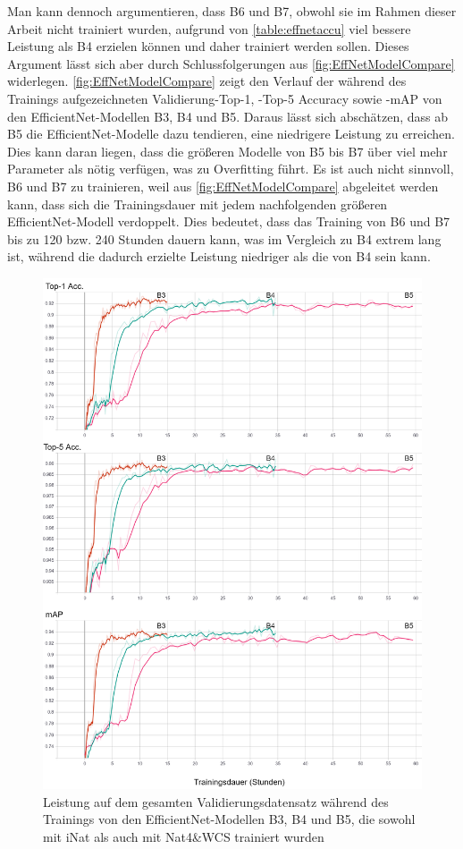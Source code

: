 Man kann dennoch argumentieren, dass B6 und B7, obwohl sie im Rahmen dieser Arbeit nicht trainiert wurden, aufgrund von \autoref{table:effnetaccu} viel bessere Leistung als B4 erzielen können und daher trainiert werden sollen. Dieses Argument lässt sich aber durch Schlussfolgerungen aus \autoref{fig:EffNetModelCompare} widerlegen. \autoref{fig:EffNetModelCompare} zeigt den Verlauf der während des Trainings aufgezeichneten Validierung-Top-1, -Top-5 Accuracy sowie -mAP von den EfficientNet-Modellen B3, B4 und B5. Daraus lässt sich abschätzen, dass ab B5 die EfficientNet-Modelle dazu tendieren, eine niedrigere Leistung zu erreichen. Dies kann daran liegen, dass die größeren Modelle von B5 bis B7 über viel mehr Parameter als nötig verfügen, was zu Overfitting führt. Es ist auch nicht sinnvoll, B6 und B7 zu trainieren, weil aus \autoref{fig:EffNetModelCompare} abgeleitet werden kann, dass sich die Trainingsdauer mit jedem nachfolgenden größeren EfficientNet-Modell verdoppelt. Dies bedeutet, dass das Training von B6 und B7 bis zu 120 bzw. 240 Stunden dauern kann, was im Vergleich zu B4 extrem lang ist, während die dadurch erzielte Leistung niedriger als die von B4 sein kann.

\begin{figure}[h]
	\centering
	\includegraphics[width=\linewidth]{images/EffNetModelCompare}
	\caption{Leistung auf dem gesamten Validierungsdatensatz während des Trainings von den EfficientNet-Modellen B3, B4 und B5, die sowohl mit iNat als auch mit Nat4\&WCS trainiert wurden}
	\label{fig:EffNetModelCompare}
\end{figure}


